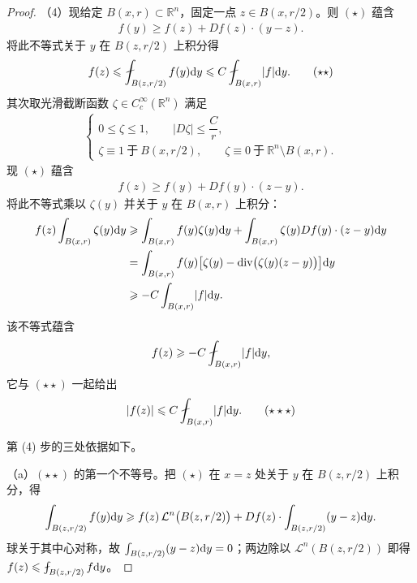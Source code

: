 \documentclass[../../main.tex]{subfiles}%
\begin{document}
\begin{proof}
（4）现给定 $B(x,r)\subset\mathbb{R}^n$，固定一点 $z\in B(x,r/2)$。则 $(\star)$ 蕴含
\begin{align*}
f(y)\geqslant f(z)+Df(z)\cdot(y-z).
\end{align*}
将此不等式关于 $y$ 在 $B(z,r/2)$ 上积分得
\begin{align*}
f(z)\leqslant\fint_{B(z,r/2)}f(y)\diff y\leqslant C\fint_{B(x,r)}\lvert f\rvert\diff y.\qquad(\star\star)
\end{align*}
其次取光滑截断函数 $\zeta\in C_c^{\infty}(\mathbb{R}^n)$ 满足
\begin{align*}
\begin{cases}
0\leqslant\zeta\leqslant1,\qquad\lvert D\zeta\rvert\leqslant\dfrac{C}{r},\\[2pt]
\zeta\equiv1\ \text{于}\ B(x,r/2),\qquad\zeta\equiv0\ \text{于}\ \mathbb{R}^n\setminus B(x,r).
\end{cases}
\end{align*}
现 $(\star)$ 蕴含
\begin{align*}
f(z)\geqslant f(y)+Df(y)\cdot(z-y).
\end{align*}
将此不等式乘以 $\zeta(y)$ 并关于 $y$ 在 $B(x,r)$ 上积分：
\begin{align*}
f(z)\int_{B(x,r)}\zeta(y)\mathrm{d} y
&\geqslant\int_{B(x,r)}f(y)\zeta(y)\mathrm{d} y+\int_{B(x,r)}\zeta(y)Df(y)\cdot(z-y)\mathrm{d} y\\
&=\int_{B(x,r)}f(y)\bigl[\zeta(y)-\operatorname{div}\bigl(\zeta(y)(z-y)\bigr)\bigr]\mathrm{d} y\\
&\geqslant-C\int_{B(x,r)}\lvert f\rvert\mathrm{d} y.
\end{align*}
该不等式蕴含
\begin{align*}
f(z)\geqslant-C\fint_{B(x,r)}\lvert f\rvert\diff y,
\end{align*}
它与 $(\star\star)$ 一起给出
\begin{align*}
\lvert f(z)\rvert\leqslant C\fint_{B(x,r)}\lvert f\rvert\diff y.\qquad(\star\star\star)
\end{align*}

第 (4) 步的三处依据如下。

（a）$(\star\star)$ 的第一个不等号。把 $(\star)$ 在 $x=z$ 处关于 $y$ 在 $B(z,r/2)$ 上积分，得
\begin{align*}
\int_{B(z,r/2)}f(y)\mathrm{d} y\geqslant f(z)\,\mathcal{L}^{n}\bigl(B(z,r/2)\bigr)+Df(z)\cdot\int_{B(z,r/2)}(y-z)\mathrm{d} y .
\end{align*}
球关于其中心对称，故 $\int_{B(z,r/2)}(y-z)\mathrm{d} y=0$；两边除以 $\mathcal{L}^{n}(B(z,r/2))$ 即得 $f(z)\leqslant\fint_{B(z,r/2)}f\diff y$。


\end{proof}
\end{document}
